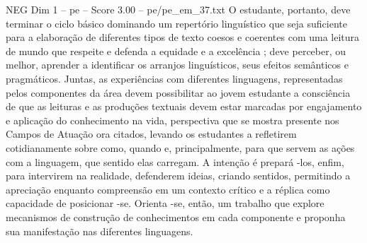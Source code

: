 \begin{textsample}{NEG Dim 1 – pe – Score 3.00 – pe/pe\_em\_37.txt}  \label{ex:f1_neg_047}
O estudante, portanto, deve terminar o ciclo básico dominando um repertório linguístico que seja suficiente para a elaboração de diferentes tipos de texto coesos e coerentes com uma leitura de mundo que respeite e defenda a equidade e a excelência ; deve perceber, ou melhor, aprender a identificar os arranjos linguísticos, seus efeitos semânticos e pragmáticos.
Juntas, as experiências com diferentes linguagens, representadas pelos componentes da área devem possibilitar ao jovem estudante a consciência de que as leituras e as produções textuais devem estar marcadas por engajamento e aplicação do conhecimento na vida, perspectiva que se mostra presente nos Campos de Atuação ora citados, levando os estudantes a refletirem cotidianamente sobre como, quando e, principalmente, para que servem as ações com a linguagem, que sentido elas carregam.
A intenção é prepará -los, enfim, para intervirem na realidade, defenderem ideias, criando sentidos, permitindo a apreciação enquanto compreensão em um contexto crítico e a réplica como capacidade de posicionar -se.
Orienta -se, então, um trabalho que explore mecanismos de construção de conhecimentos em cada componente e proponha sua manifestação nas diferentes linguagens.

\end{textsample}
